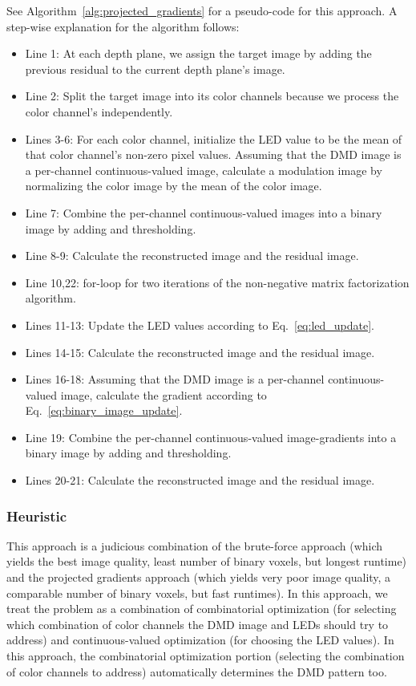 
See Algorithm~\ref{alg:projected_gradients} for a pseudo-code for this approach. A step-wise explanation for the algorithm follows:
\begin{itemize}
    \item Line 1: At each depth plane, we assign the target image by adding the previous residual to the current depth plane's image. 
    \item Line 2: Split the target image into its color channels because we process the color channel's independently.
    \item Lines 3-6: For each color channel, initialize the LED value to be the mean of that color channel's non-zero pixel values. Assuming that the DMD image is a per-channel continuous-valued image, calculate a modulation image by normalizing the color image by the mean of the color image.  
    \item Line 7: Combine the per-channel continuous-valued images into a binary image by adding and thresholding. 
    \item Line 8-9: Calculate the reconstructed image and the residual image.
    \item Line 10,22: for-loop for two iterations of the non-negative matrix factorization algorithm.
    \item Lines 11-13: Update the LED values according to Eq.~\ref{eq:led_update}.
    \item Lines 14-15: Calculate the reconstructed image and the residual image.
    \item Lines 16-18: Assuming that the DMD image is a per-channel continuous-valued image, calculate the gradient according to Eq.~\ref{eq:binary_image_update}.
    \item Line 19: Combine the per-channel continuous-valued image-gradients into a binary image by adding and thresholding.
    \item Lines 20-21: Calculate the reconstructed image and the residual image.
\end{itemize}

\subsubsection{Heuristic}
\label{sec:acd:heuristis}
This approach is a judicious combination of the brute-force approach (which yields the best image quality, least number of binary voxels, but longest runtime) and the projected gradients approach (which yields very poor image quality, a comparable number of binary voxels, but fast runtimes). 
In this approach, we treat the problem as a combination of combinatorial optimization (for selecting which combination of color channels the DMD image and LEDs should try to address) and continuous-valued optimization (for choosing the LED values). 
In this approach, the combinatorial optimization portion (selecting the combination of color channels to address) automatically determines the DMD pattern too.

